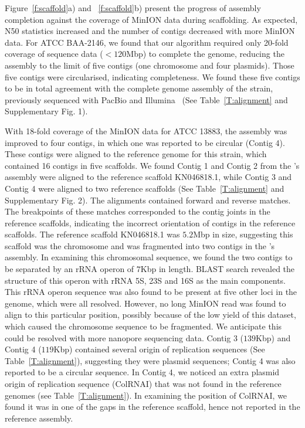Figure~\ref{f:scaffold}a) and ~\ref{f:scaffold}b) present the progress of 
assembly completion against the coverage of MinION data during scaffolding.
As expected, N50 statistics increased and the number of contigs 
decreased with more MinION data. For \kp{} ATCC BAA-2146, we found that
our algorithm required only 20-fold coverage of sequence data ($<120$Mbp) to
complete the genome, reducing the assembly to the limit of five contigs (one
chromosome and four plasmids). Those five contigs were circularised, indicating
completeness. We found these five contigs to be in total agreement
with the complete genome assembly of the strain, previously sequenced with PacBio and
Illumina~\cite{HudsonBM2014} (See Table~\ref{T:alignment} and Supplementary
Fig. 1).


With 18-fold coverage of the MinION data for \kp{} ATCC 13883, the
assembly was improved to four contigs, in which one was reported to be circular
(Contig 4). These contigs were aligned to the reference genome for this strain, 
which contained 16 contigs in five scaffolds. We found Contig 1 and Contig 2
from the \npscarf{}'s assembly were aligned to the reference scaffold KN046818.1,
while Contig 3 and Contig 4 were aligned to two reference scaffolds (See
Table~\ref{T:alignment} and Supplementary Fig. 2). The
alignments contained forward and reverse matches. The breakpoints of
these matches corresponded to the contig joints in the reference scaffolds,
indicating the incorrect orientation of contigs in the reference scaffolds. 
The reference scaffold KN046818.1 was $5.2$Mbp in size, suggesting 
this scaffold was the
chromosome and was fragmented into two contigs in the \npscarf{}'s assembly. In
examining this chromosomal sequence, we found the two contigs to be separated by an 
rRNA operon of $7$Kbp in length. BLAST search revealed the structure of this operon
with rRNA 5S, 23S and 16S as the main components. This rRNA operon sequence was
also found to be present at five other loci in the genome, which were all
resolved. However, no long MinION read was found to align to this
particular position, possibly because of the low yield of this dataset, which
caused the chromosome sequence to be fragmented. 
We anticipate this could be resolved with more nanopore sequencing data.
Contig 3 ($139$Kbp) and Contig 4 ($119$Kbp) contained several
origin of replication sequences (See Table~\ref{T:alignment}), suggesting they 
were plasmid sequences; Contig 4 was also reported to be a circular sequence.
In Contig 4, we noticed an extra plasmid origin of replication sequence (ColRNAI) that
was not found in the reference genomes (see Table~\ref{T:alignment}).
In examining the position of ColRNAI, we found it was
in one of the gaps in the reference scaffold, hence not reported in the
reference assembly.

